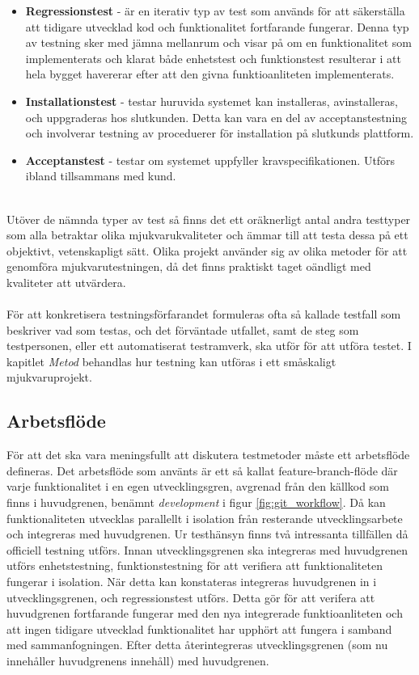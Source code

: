\begin{itemize}
\item \textbf{Regressionstest} - är en iterativ typ av test som används för att säkerställa att tidigare utvecklad kod och funktionalitet fortfarande fungerar. Denna typ av testning sker med jämna mellanrum och visar på om en funktionalitet som implementerats och klarat både enhetstest och funktionstest resulterar i att hela bygget havererar efter att den givna funktioanliteten implementerats.\cite{integration_testing}
\item \textbf{Installationstest} - testar huruvida systemet kan installeras, avinstalleras, och uppgraderas hos slutkunden. Detta kan vara en del av acceptanstestning och involverar testning av proceduerer för installation på slutkunds plattform.
\item \textbf{Acceptanstest} - testar om systemet uppfyller kravspecifikationen. Utförs ibland tillsammans med kund.
\end{itemize}
\ \\
Utöver de nämnda typer av test så finns det ett oräknerligt antal andra testtyper som alla betraktar olika mjukvarukvaliteter och ämmar till att testa dessa på ett objektivt, vetenskapligt sätt. Olika projekt använder sig av olika metoder för att genomföra mjukvarutestningen, då det finns praktiskt taget oändligt med kvaliteter att utvärdera. \\
\\
För att konkretisera testningsförfarandet formuleras ofta så kallade testfall som beskriver vad som testas, och det förväntade utfallet, samt de steg som testpersonen, eller ett automatiserat testramverk, ska utför för att utföra testet. I kapitlet \emph{Metod} behandlas hur testning kan utföras i ett småskaligt mjukvaruprojekt.

\subsection{Arbetsflöde}
För att det ska vara meningsfullt att diskutera testmetoder måste ett arbetsflöde defineras. Det arbetsflöde som använts är ett så kallat feature-branch-flöde där varje funktionalitet i en egen utvecklingsgren, avgrenad från den källkod som finns i huvudgrenen, benämnt \textit{development} i figur \ref{fig:git_workflow}.\cite{website:atlassian_git} Då kan funktionaliteten utvecklas parallellt i isolation från resterande utvecklingsarbete och integreras med huvudgrenen. Ur testhänsyn finns två intressanta tillfällen då officiell testning utförs. Innan utvecklingsgrenen ska integreras med huvudgrenen utförs enhetstestning, funktionstestning för att verifiera att funktionaliteten fungerar i isolation. När detta kan konstateras integreras huvudgrenen in i utvecklingsgrenen, och regressionstest utförs. Detta gör för att verifera att huvudgrenen fortfarande fungerar med den nya integrerade funktioanliteten och att ingen tidigare utvecklad funktionalitet har upphört att fungera i samband med sammanfogningen. Efter detta återintegreras utvecklingsgrenen (som nu innehåller huvudgrenens innehåll) med huvudgrenen.

